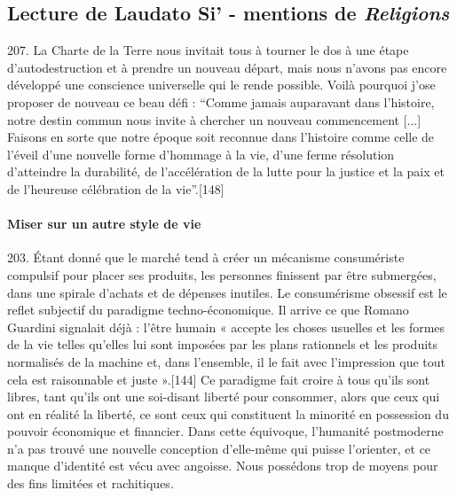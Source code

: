 \subsection{Lecture de Laudato Si’ - mentions de \textit{Religions}}

\begin{singlequote}
        207. La Charte de la Terre nous invitait tous à tourner le dos à une étape d’autodestruction et à prendre un nouveau départ, mais nous n’avons pas encore développé une conscience universelle qui le rende possible. Voilà pourquoi j’ose proposer de nouveau ce beau défi : “Comme jamais auparavant dans l’histoire, notre destin commun nous invite à chercher un nouveau commencement [...] Faisons en sorte que notre époque soit reconnue dans l’histoire comme celle de l’éveil d’une nouvelle forme d’hommage à la vie, d’une ferme résolution d’atteindre la durabilité, de l’accélération de la lutte pour la justice et la paix et de l’heureuse célébration de la vie”.[148]
\end{singlequote}
       
\paragraph{Miser sur un autre style de vie}
\begin{singlequote}
        203. Étant donné que le marché tend à créer un mécanisme consumériste compulsif pour placer ses produits, les personnes finissent par être submergées, dans une spirale d’achats et de dépenses inutiles. Le consumérisme obsessif est le reflet subjectif du paradigme techno-économique. Il arrive ce que Romano Guardini signalait déjà : l’être humain « accepte les choses usuelles et les formes de la vie telles qu’elles lui sont imposées par les plans rationnels et les produits normalisés de la machine et, dans l’ensemble, il le fait avec l’impression que tout cela est raisonnable et juste ».[144] Ce paradigme fait croire à tous qu’ils sont libres, tant qu’ils ont une soi-disant liberté pour consommer, alors que ceux qui ont en réalité la liberté, ce sont ceux qui constituent la minorité en possession du pouvoir économique et financier. Dans cette équivoque, l’humanité postmoderne n’a pas trouvé une nouvelle conception d’elle-même qui puisse l’orienter, et ce manque d’identité est vécu avec angoisse. Nous possédons trop de moyens pour des fins limitées et rachitiques.

\end{singlequote}

